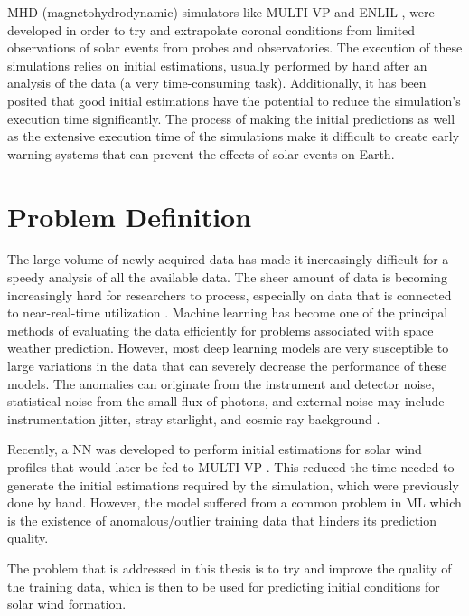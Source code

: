 MHD (magnetohydrodynamic) simulators like MULTI-VP \cite{pinto.rouillard_MultipleFluxtubeSolar_2017} and ENLIL \cite{odstrcil.pizzo_ThreedimensionalPropagationCoronal_1999}, were developed in order to try and extrapolate coronal conditions from limited observations of solar events from probes and observatories. The execution of these simulations relies on initial estimations, usually performed by hand after an analysis of the data (a very time-consuming task). Additionally, it has been posited that good initial estimations have the potential to reduce the simulation's execution time significantly. The process of making the initial predictions as well as the extensive execution time of the simulations make it difficult to create early warning systems that can prevent the effects of solar events on Earth.

\section{Problem Definition} \label{sec:prob_definition}
The large volume of newly acquired data has made it increasingly difficult for a speedy analysis of all the available data. The sheer amount of data is becoming increasingly hard for researchers to process, especially on data that is connected to near-real-time utilization \cite{anirudh2022ReviewDataDriven2022}. Machine learning has become one of the principal methods of evaluating the data efficiently for problems associated with space weather prediction. However, most deep learning models are very susceptible to large variations in the data that can severely decrease the performance of these models. The anomalies can originate from the instrument and detector noise, statistical noise from the small flux of photons, and external noise may include instrumentation jitter, stray starlight, and cosmic ray background \cite{anirudh2022ReviewDataDriven2022}.

Recently, a NN \cite{barros_InitialConditionEstimation_} was developed to perform initial estimations for solar wind profiles that would later be fed to MULTI-VP \cite{pinto.rouillard_MultipleFluxtubeSolar_2017}. This reduced the time needed to generate the initial estimations required by the simulation, which were previously done by hand. However, the model suffered from a common problem in ML which is the existence of anomalous/outlier training data that hinders its prediction quality.

The problem that is addressed in this thesis is to try and improve the quality of the training data, which is then to be used for predicting initial conditions for solar wind formation.

